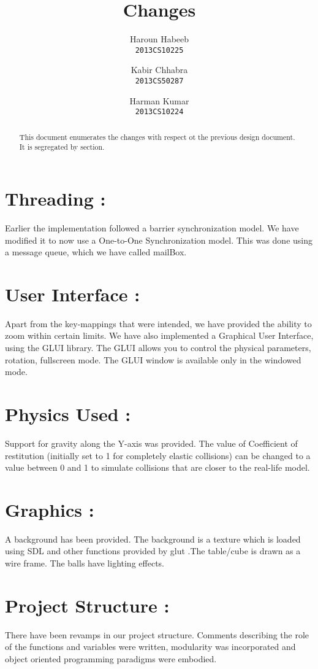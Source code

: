 \documentclass[]{article}
\begin{document}
\author{
  Haroun Habeeb\\
  \texttt{2013CS10225}
  \and
  Kabir Chhabra\\
  \texttt{2013CS50287}
  \and
  Harman Kumar\\
  \texttt{2013CS10224}
}

\title{Changes}
\maketitle

\begin{abstract}
\noindent This document enumerates the changes with respect ot the previous design document. It is segregated by section.
\end{abstract}

\section{ \bf Threading :}
Earlier the implementation followed a barrier synchronization model. We have modified it to now use a One-to-One Synchronization model. This was done using a message queue, which we have called mailBox.

\section{ \bf User Interface : }
Apart from the key-mappings that were intended, we have provided the ability to zoom within certain limits. We have also implemented a Graphical User Interface, using the GLUI library. The GLUI allows you to control the physical parameters, rotation, fullscreen mode. The GLUI window is available only in the windowed mode.

\section{ \bf Physics Used :}
Support for gravity along the Y-axis was provided. The value of Coefficient of restitution (initially set to 1 for completely elastic collisions) can be changed to a value between 0 and 1 to simulate collisions that are closer to the real-life model.

\section{ \bf Graphics :}
A background has been provided. The background is a texture which is loaded using SDL and other functions provided by glut .The table/cube is drawn as a wire frame. The balls have lighting effects.

\section{ \bf Project Structure :}
There have been revamps in our project structure. Comments describing the role of the functions and variables were written, modularity was incorporated and object oriented programming paradigms were embodied.
\end{document}
